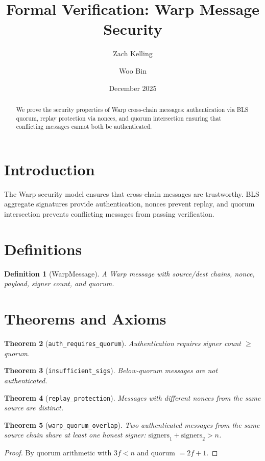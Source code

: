 \documentclass[11pt]{article}
\title{Formal Verification: Warp Message Security}
\author{Zach Kelling \and Woo Bin}
\date{December 2025}
\newtheorem{theorem}{Theorem}
\newtheorem{definition}[theorem]{Definition}
\begin{document}
\maketitle

\begin{abstract}
We prove the security properties of Warp cross-chain messages: authentication via BLS quorum, replay protection via nonces, and quorum intersection ensuring that conflicting messages cannot both be authenticated.
\end{abstract}

\section{Introduction}
The Warp security model ensures that cross-chain messages are trustworthy. BLS aggregate signatures provide authentication, nonces prevent replay, and quorum intersection prevents conflicting messages from passing verification.

\section{Definitions}
\begin{definition}[WarpMessage]
A Warp message with source/dest chains, nonce, payload, signer count, and quorum.
\end{definition}


\section{Theorems and Axioms}
\begin{theorem}[\texttt{auth\_requires\_quorum}]
Authentication requires signer count $\geq$ quorum.
\end{theorem}

\begin{theorem}[\texttt{insufficient\_sigs}]
Below-quorum messages are not authenticated.
\end{theorem}

\begin{theorem}[\texttt{replay\_protection}]
Messages with different nonces from the same source are distinct.
\end{theorem}

\begin{theorem}[\texttt{warp\_quorum\_overlap}]
Two authenticated messages from the same source chain share at least one honest signer: $\text{signers}_1 + \text{signers}_2 > n$.
\end{theorem}
\begin{proof}
By quorum arithmetic with $3f < n$ and quorum $= 2f+1$.
\end{proof}
\end{document}
